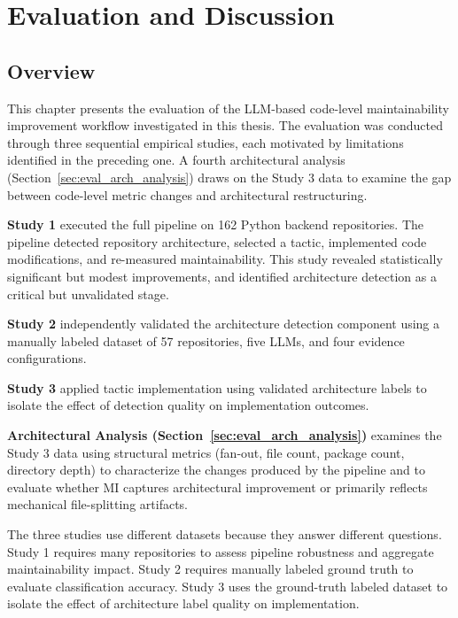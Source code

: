 \chapter{Evaluation and Discussion}
\label{chap:eval}

\section{Overview}
\label{sec:eval_overview}

This chapter presents the evaluation of the LLM-based code-level maintainability improvement workflow investigated in this thesis. The evaluation was conducted through three sequential empirical studies, each motivated by limitations identified in the preceding one. A fourth architectural analysis (Section~\ref{sec:eval_arch_analysis}) draws on the Study 3 data to examine the gap between code-level metric changes and architectural restructuring.

\textbf{Study 1} executed the full pipeline on 162 Python backend repositories. The pipeline detected repository architecture, selected a tactic, implemented code modifications, and re-measured maintainability. This study revealed statistically significant but modest improvements, and identified architecture detection as a critical but unvalidated stage.

\textbf{Study 2} independently validated the architecture detection component using a manually labeled dataset of 57 repositories, five LLMs, and four evidence configurations.

\textbf{Study 3} applied tactic implementation using validated architecture labels to isolate the effect of detection quality on implementation outcomes.

\textbf{Architectural Analysis (Section~\ref{sec:eval_arch_analysis})} examines the Study 3 data using structural metrics (fan-out, file count, package count, directory depth) to characterize the changes produced by the pipeline and to evaluate whether MI captures architectural improvement or primarily reflects mechanical file-splitting artifacts.

The three studies use different datasets because they answer different questions. Study 1 requires many repositories to assess pipeline robustness and aggregate maintainability impact. Study 2 requires manually labeled ground truth to evaluate classification accuracy. Study 3 uses the ground-truth labeled dataset to isolate the effect of architecture label quality on implementation.

